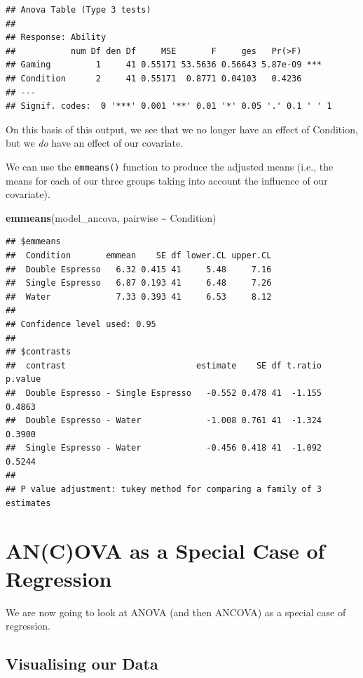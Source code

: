 \documentclass[
]{book}
\newenvironment{Shaded}{\begin{snugshade}}{\end{snugshade}}
\newcommand{\FunctionTok}[1]{\textcolor[rgb]{0.13,0.29,0.53}{\textbf{#1}}}
\newcommand{\NormalTok}[1]{#1}
\newcommand{\SpecialCharTok}[1]{\textcolor[rgb]{0.81,0.36,0.00}{\textbf{#1}}}
\begin{document}
\begin{verbatim}
## Anova Table (Type 3 tests)
## 
## Response: Ability
##           num Df den Df     MSE       F     ges   Pr(>F)    
## Gaming         1     41 0.55171 53.5636 0.56643 5.87e-09 ***
## Condition      2     41 0.55171  0.8771 0.04103   0.4236    
## ---
## Signif. codes:  0 '***' 0.001 '**' 0.01 '*' 0.05 '.' 0.1 ' ' 1
\end{verbatim}

On this basis of this output, we see that we no longer have an effect of Condition, but we \emph{do} have an effect of our covariate.

We can use the \texttt{emmeans()} function to produce the adjusted means (i.e., the means for each of our three groups taking into account the influence of our covariate).

\begin{Shaded}
\begin{Highlighting}[]
\FunctionTok{emmeans}\NormalTok{(model\_ancova, pairwise }\SpecialCharTok{\textasciitilde{}}\NormalTok{ Condition)}
\end{Highlighting}
\end{Shaded}

\begin{verbatim}
## $emmeans
##  Condition       emmean    SE df lower.CL upper.CL
##  Double Espresso   6.32 0.415 41     5.48     7.16
##  Single Espresso   6.87 0.193 41     6.48     7.26
##  Water             7.33 0.393 41     6.53     8.12
## 
## Confidence level used: 0.95 
## 
## $contrasts
##  contrast                          estimate    SE df t.ratio p.value
##  Double Espresso - Single Espresso   -0.552 0.478 41  -1.155  0.4863
##  Double Espresso - Water             -1.008 0.761 41  -1.324  0.3900
##  Single Espresso - Water             -0.456 0.418 41  -1.092  0.5244
## 
## P value adjustment: tukey method for comparing a family of 3 estimates
\end{verbatim}

\hypertarget{ancova-as-a-special-case-of-regression}{%
\section{AN(C)OVA as a Special Case of Regression}\label{ancova-as-a-special-case-of-regression}}

We are now going to look at ANOVA (and then ANCOVA) as a special case of regression.

\hypertarget{visualising-our-data-4}{%
\subsection{Visualising our Data}\label{visualising-our-data-4}}
\end{document}
